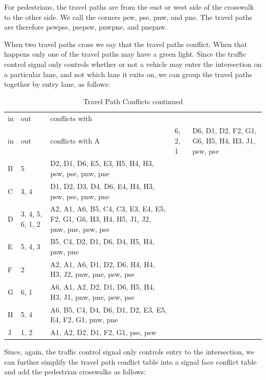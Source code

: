 \documentclass[letterpaper,twoside]{article}
\begin{document}
For pedestrians, the travel paths are from the east or west
side of the crosswalk to the other side.  We call the corners
psw, pse, pnw, and pne.  The travel paths are therefore pswpse, psepsw,
pnwpne, and pnepnw.

When two travel paths cross we say that the travel paths conflict.
When that happens only one of the travel paths may have a green light.
Since the traffic control signal only controls whether or not a vehicle
may enter the intersection on a particular lane, and not which
lane it exits on, we can group the travel paths together by entry lane, as
follows:

\begin{longtable}{l |l| p{8cm}}
  \caption{Travel Path Conflicts} \\
  in & out & conflicts with \endfirsthead
  \caption{Travel Path Conflicts continued} \\
  in & out & conflicts with \endhead
  \hline
  A & 6, 2, 1 & D6, D1, D2, F2, G1, G6, H5, H4, H3, J1, psw, pse \\
  B & 5 & D2, D1, D6, E5, E3, H5, H4, H3, psw, pse, pnw, pne \\
  C & 3, 4 & D1, D2, D3, D4, D6, E4, H4, H3, psw, pse, pnw, pne \\
  D & 3, 4, 5, 6, 1, 2 & A2, A1, A6, B5, C4, C3, E3, E4, E5, F2, G1, G6, H3,
  H4, H5, J1, J2, pnw, pne, psw, pse \\
  E & 5, 4, 3 & B5, C4, D2, D1, D6, D4, H5, H4, pnw, pne  \\
  F & 2 & A2, A1, A6, D1, D2, D6, H4, H4, H3, J2, pnw, pne, psw, pse \\
  G & 6, 1 & A6, A1, A2, D2, D1, D6, H5, H4, H3, J1, pnw, pne, psw, pse \\
  H & 5, 4 & A6, B5, C4, D4, D6, D1, D2, E3, E5, E4, F2, G1, pnw, pne \\
  J & 1, 2 & A1, A2, D2, D1, F2, G1, pse, psw \\
\end{longtable}

Since, again, the traffic control signal only controls entry to the
intersection,
we can further simplify the travel path conflict table into a signal face
conflict table and add the pedestrian crosswalks as follows:
\end{document}
